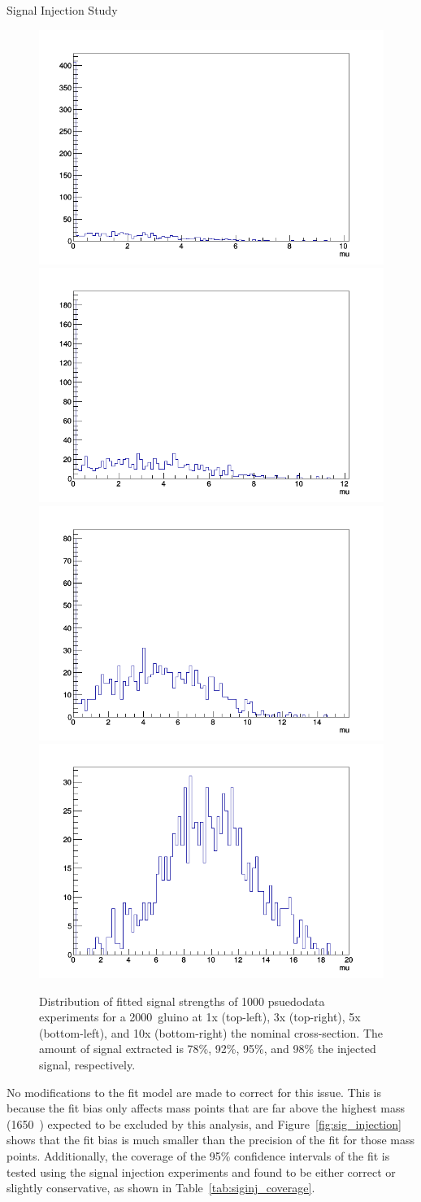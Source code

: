 \begin{subsection}{Signal Injection Study}
\begin{figure}[tbp!]
\centering
\includegraphics[angle=0,width=0.45\columnwidth]{fig/siginj_bias_1x.png}
\includegraphics[angle=0,width=0.45\columnwidth]{fig/siginj_bias_3x.png}
\includegraphics[angle=0,width=0.45\columnwidth]{fig/siginj_bias_5x.png}
\includegraphics[angle=0,width=0.45\columnwidth]{fig/siginj_bias_10x.png}
\caption{Distribution of fitted signal strengths of 1000 psuedodata experiments for a 2000~\GeV gluino at 1x (top-left), 3x (top-right), 5x (bottom-left), and 10x (bottom-right) the nominal cross-section.
The amount of signal extracted is 78\%, 92\%, 95\%, and 98\% the injected signal, respectively.}
\label{fig:siginj_bias_study}
\end{figure}

No modifications to the fit model are made to correct for this issue.
This is because the fit bias only affects mass points that are far above the highest mass (1650~\GeV) expected to be excluded by this analysis, and Figure~\ref{fig:sig_injection} shows that the fit bias is much smaller than the precision of the fit for those mass points.
Additionally, the coverage of the 95\% confidence intervals of the fit is tested using the signal injection experiments and found to be either correct or slightly conservative, as shown in Table~\ref{tab:siginj_coverage}.


\end{subsection}
